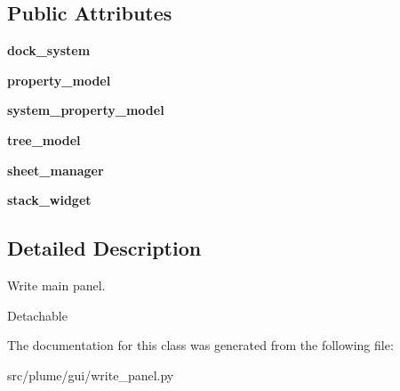 \subsection*{Public Attributes}
\begin{DoxyCompactItemize}
\item 
{\bfseries dock\+\_\+system}\hypertarget{classplume-creator_1_1src_1_1plume_1_1gui_1_1write__panel_1_1_write_panel_a18dc90e115e8607c7f6a8613322a53dd}{}\label{classplume-creator_1_1src_1_1plume_1_1gui_1_1write__panel_1_1_write_panel_a18dc90e115e8607c7f6a8613322a53dd}

\item 
{\bfseries property\+\_\+model}\hypertarget{classplume-creator_1_1src_1_1plume_1_1gui_1_1write__panel_1_1_write_panel_ace6c50b161a5540a157bd713780ad570}{}\label{classplume-creator_1_1src_1_1plume_1_1gui_1_1write__panel_1_1_write_panel_ace6c50b161a5540a157bd713780ad570}

\item 
{\bfseries system\+\_\+property\+\_\+model}\hypertarget{classplume-creator_1_1src_1_1plume_1_1gui_1_1write__panel_1_1_write_panel_addbd825dbb8d68838f8c597ade912cc0}{}\label{classplume-creator_1_1src_1_1plume_1_1gui_1_1write__panel_1_1_write_panel_addbd825dbb8d68838f8c597ade912cc0}

\item 
{\bfseries tree\+\_\+model}\hypertarget{classplume-creator_1_1src_1_1plume_1_1gui_1_1write__panel_1_1_write_panel_a4d198e161eb04677b60837f915497b9d}{}\label{classplume-creator_1_1src_1_1plume_1_1gui_1_1write__panel_1_1_write_panel_a4d198e161eb04677b60837f915497b9d}

\item 
{\bfseries sheet\+\_\+manager}\hypertarget{classplume-creator_1_1src_1_1plume_1_1gui_1_1write__panel_1_1_write_panel_a107691390d13b670c383bbe6eecb0081}{}\label{classplume-creator_1_1src_1_1plume_1_1gui_1_1write__panel_1_1_write_panel_a107691390d13b670c383bbe6eecb0081}

\item 
{\bfseries stack\+\_\+widget}\hypertarget{classplume-creator_1_1src_1_1plume_1_1gui_1_1write__panel_1_1_write_panel_a9b5fefdb53611e790087b5273fddc2c7}{}\label{classplume-creator_1_1src_1_1plume_1_1gui_1_1write__panel_1_1_write_panel_a9b5fefdb53611e790087b5273fddc2c7}

\end{DoxyCompactItemize}


\subsection{Detailed Description}
\textquotesingle{}Write\textquotesingle{} main panel. 

Detachable 

The documentation for this class was generated from the following file\+:\begin{DoxyCompactItemize}
\item 
src/plume/gui/write\+\_\+panel.\+py\end{DoxyCompactItemize}
